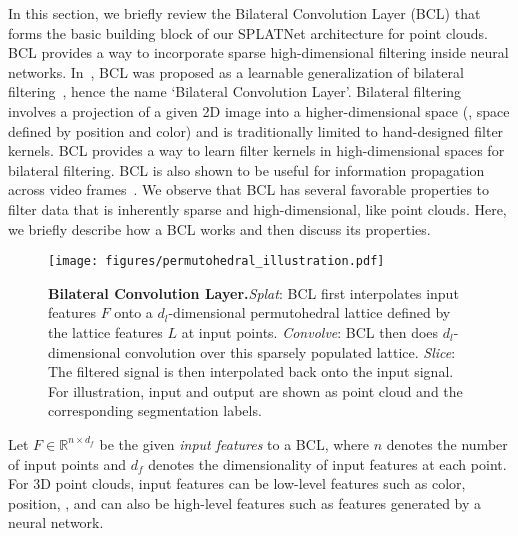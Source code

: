 \documentclass[10pt,twocolumn,letterpaper]{article}
\newcommand{\mycaption}[2]{\caption{\textbf{#1.}\xspace#2}}
\newcommand{\camreadycomment}[1]{{\textcolor{red}{#1}}}
\begin{document}
In this section, we briefly review the Bilateral Convolution Layer (BCL) 
that forms the basic building block of our SPLATNet architecture for point clouds.
BCL provides a way to incorporate sparse high-dimensional
filtering inside neural networks. In~\cite{jampani2016learning,kiefel:iclr:2015}, BCL was proposed as a learnable generalization
of bilateral filtering~\cite{tomasi1998bilateral,aurich1995non}, 
hence the name `Bilateral Convolution Layer'.
Bilateral filtering involves a projection of a given 2D image into
a higher-dimensional space (\eg, space defined by position and color) and
is traditionally limited to hand-designed filter kernels. BCL provides a way to learn filter
kernels in high-dimensional spaces for bilateral filtering.
BCL is also shown to be useful for information propagation across video 
frames~\cite{jampani2017video}.
We observe that BCL has several favorable properties to
filter data that is inherently sparse and high-dimensional, like point clouds.
Here, we briefly describe how a BCL works and then discuss its properties.

\begin{figure}
\vspace{-0.2cm}
\begin{center}
\centerline{\texttt{[image: figures/permutohedral\_illustration.pdf]}}
  \vspace{-0.2cm}
  \mycaption{Bilateral Convolution Layer}{\emph{Splat}: BCL first interpolates input features $F$ onto a $d_l$-dimensional permutohedral lattice defined by the lattice features $L$ at input points. \emph{Convolve}: BCL then does $d_l$-dimensional convolution over this sparsely populated lattice. \emph{Slice}: The filtered signal is then interpolated back onto the input signal. For illustration, input and output are shown as point cloud and the corresponding segmentation labels.}
  \label{fig:bcl}
\end{center}
\vspace{-.8cm}
\end{figure}%
Let $F \in \mathbb{R}^{n \times d_f}$ be the given \emph{input features} to a BCL, where $n$ denotes
the number of input points and $d_f$ denotes the dimensionality of input features at each point.
For 3D point clouds, input features can be low-level features such as color, position, \etc, and can also
be high-level features such as features generated by a neural network.
\end{document}
